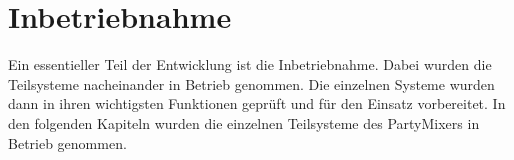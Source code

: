 \newpage
\section{Inbetriebnahme}
\label{sec:Inbetriebnahme}

Ein essentieller Teil der Entwicklung ist die Inbetriebnahme. Dabei wurden die Teilsysteme nacheinander in Betrieb genommen. Die einzelnen Systeme wurden dann in ihren wichtigsten Funktionen geprüft und für den Einsatz vorbereitet. In den folgenden Kapiteln wurden die einzelnen Teilsysteme des PartyMixers in Betrieb genommen. 
